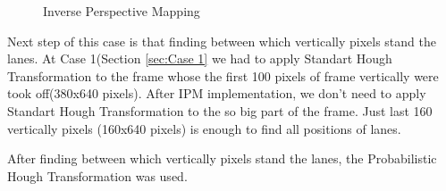  
\begin{figure}[H]
  \centering
  \hfill
  \caption{Inverse Perspective Mapping}
\end{figure} 

Next step of this case is that finding between which vertically pixels stand the lanes. At Case 1(Section \ref{sec:Case 1} we had to apply Standart Hough Transformation to the frame whose the first 100 pixels of frame vertically were took off(380x640 pixels). After IPM implementation, we don't need to apply Standart Hough Transformation to the so big part of the frame. Just last 160 vertically pixels (160x640 pixels) is enough to find all positions of lanes.

After finding between which vertically pixels stand the lanes, the Probabilistic Hough Transformation was used.

%
